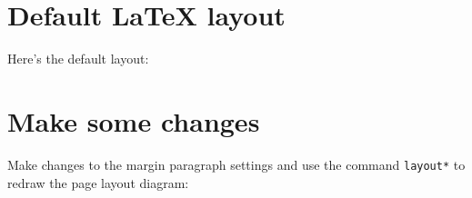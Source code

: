 \documentclass{article}
\begin{document}
	\section{Default \LaTeX{} layout}
	Here's the default layout:
	
	\vspace{10pt}
	\layout
	\section{Make some changes}
	Make changes to the margin paragraph settings and use the command \verb|layout*| to redraw the page layout diagram:
	\vspace{10pt}
	\setlength{\marginparwidth}{0pt}
	\setlength{\marginparsep}{0pt}
	
	\layout*
\end{document}
